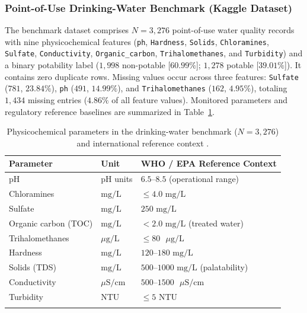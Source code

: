 \documentclass[pdflatex,sn-mathphys-num]{sn-jnl}%
\theoremstyle{thmstyleone}%
\theoremstyle{thmstyletwo}%
\theoremstyle{thmstylethree}%
\begin{document}
\subsubsection{Point-of-Use Drinking-Water Benchmark (Kaggle Dataset)}\label{subsubsec4_1_1}
The benchmark dataset comprises $N = 3,276$ point-of-use water quality records with nine physicochemical features \cite{kadiwal2020} (\texttt{ph}, \texttt{Hardness}, \texttt{Solids}, \texttt{Chloramines}, \texttt{Sulfate}, \texttt{Conductivity}, \texttt{Organic\_carbon}, \texttt{Trihalomethanes}, and \texttt{Turbidity}) and a binary potability label ($1,998$ non-potable [$60.99\%$]; $1,278$ potable [$39.01\%$]). It contains zero duplicate rows. Missing values occur across three features: \texttt{Sulfate} ($781$, $23.84\%$), \texttt{ph} ($491$, $14.99\%$), and \texttt{Trihalomethanes} ($162$, $4.95\%$), totaling $1,434$ missing entries ($4.86\%$ of all feature values). Monitored parameters and regulatory reference baselines are summarized in Table~\ref{tab_who}.
\begin{table}[t]
\caption{Physicochemical parameters in the drinking-water benchmark ($N = 3,276$) and international reference context \cite{who2017,rachid2025}.}\label{tab_who}%
\begin{tabular}{@{}p{}p{}p{}@{}}
\toprule
Parameter & Unit & WHO / EPA Reference Context\footnotemark[1] \\
\midrule
pH & pH units & $6.5$--$8.5$ (operational range) \\
Chloramines & $\text{mg/L}$ & $\le 4.0\text{ mg/L}$ \\
Sulfate & $\text{mg/L}$ & $250\text{ mg/L}$ \\
Organic carbon (TOC) & $\text{mg/L}$ & $< 2.0\text{ mg/L}$ (treated water) \\
Trihalomethanes & $\mu\text{g/L}$ & $\le 80\text{ }\mu\text{g/L}$ \\
Hardness & $\text{mg/L}$ & $120$--$180\text{ mg/L}$ \\
Solids (TDS) & $\text{mg/L}$ & $500$--$1000\text{ mg/L}$ (palatability) \\
Conductivity & $\mu\text{S/cm}$ & $500$--$1500\text{ }\mu\text{S/cm}$ \\
Turbidity & NTU & $\le 5\text{ NTU}$ \\
\botrule
\end{tabular}
\end{table}
\end{document}
